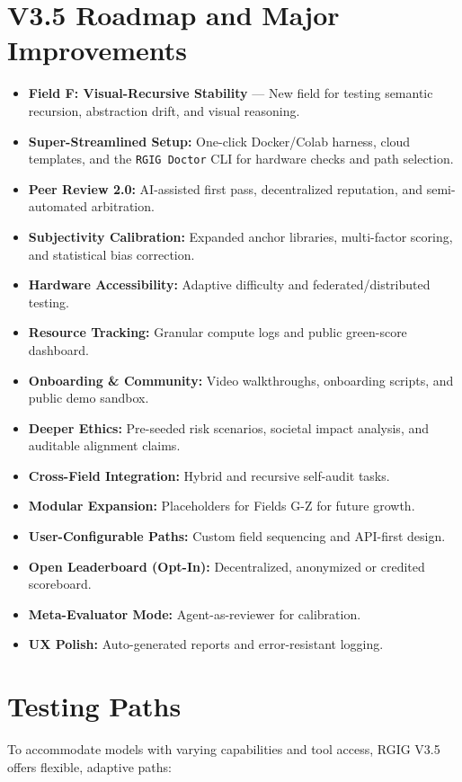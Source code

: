 \documentclass[11pt]{article}
\begin{document}
\section*{V3.5 Roadmap and Major Improvements}
\begin{itemize}
  \item \textbf{Field F: Visual-Recursive Stability} — New field for testing semantic recursion, abstraction drift, and visual reasoning.
  \item \textbf{Super-Streamlined Setup:} One-click Docker/Colab harness, cloud templates, and the \texttt{RGIG Doctor} CLI for hardware checks and path selection.
  \item \textbf{Peer Review 2.0:} AI-assisted first pass, decentralized reputation, and semi-automated arbitration.
  \item \textbf{Subjectivity Calibration:} Expanded anchor libraries, multi-factor scoring, and statistical bias correction.
  \item \textbf{Hardware Accessibility:} Adaptive difficulty and federated/distributed testing.
  \item \textbf{Resource Tracking:} Granular compute logs and public green-score dashboard.
  \item \textbf{Onboarding \& Community:} Video walkthroughs, onboarding scripts, and public demo sandbox.
  \item \textbf{Deeper Ethics:} Pre-seeded risk scenarios, societal impact analysis, and auditable alignment claims.
  \item \textbf{Cross-Field Integration:} Hybrid and recursive self-audit tasks.
  \item \textbf{Modular Expansion:} Placeholders for Fields G-Z for future growth.
  \item \textbf{User-Configurable Paths:} Custom field sequencing and API-first design.
  \item \textbf{Open Leaderboard (Opt-In):} Decentralized, anonymized or credited scoreboard.
  \item \textbf{Meta-Evaluator Mode:} Agent-as-reviewer for calibration.
  \item \textbf{UX Polish:} Auto-generated reports and error-resistant logging.
\end{itemize}

\section*{Testing Paths}
To accommodate models with varying capabilities and tool access, RGIG V3.5 offers flexible, adaptive paths:
\end{document}
